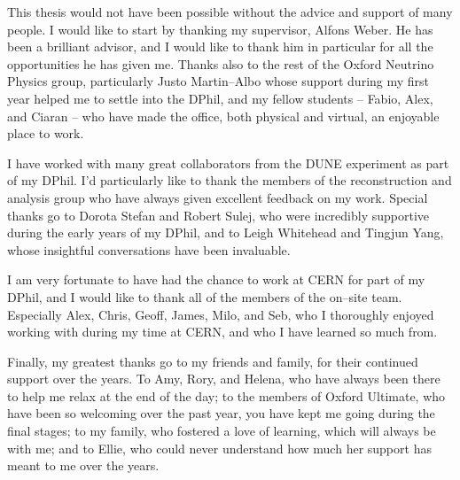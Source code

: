 This thesis would not have been possible without the advice and support of many
people. I would like to start by thanking my supervisor, Alfons Weber. He has
been a brilliant advisor, and I would like to thank him in particular for all
the opportunities he has given me. Thanks also to the rest of the Oxford
Neutrino Physics group, particularly Justo Martin--Albo whose support during 
my first year helped me to settle into the DPhil, and my fellow students -- 
Fabio, Alex, and Ciaran -- who have made the office, both physical and 
virtual, an enjoyable place to work.

\medskip\noindent
I have worked with many great collaborators from the DUNE experiment
as part of my DPhil. I'd particularly like to thank the members of the 
\protodune{} reconstruction and analysis group who have always given 
excellent feedback on my work. Special thanks go to Dorota Stefan and Robert 
Sulej, who were incredibly supportive during the early years of my DPhil, and 
to Leigh Whitehead and Tingjun Yang, whose insightful conversations have been 
invaluable. 

\medskip\noindent
I am very fortunate to have had the chance to work at CERN for part of my DPhil,
and I would like to thank all of the members of the on--site \protodune{} 
team. Especially Alex, Chris, Geoff, James, Milo, and Seb, who I thoroughly 
enjoyed working with during my time at CERN, and who I have learned so much 
from. 

\medskip\noindent
Finally, my greatest thanks go to my friends and family, for their continued
support over the years. To Amy, Rory, and Helena, who have always been there to
help me relax at the end of the day; to the members of Oxford Ultimate, who have
been so welcoming over the past year, you have kept me going during the final 
stages; to my family, who fostered a love of learning, which will always be 
with me; and to Ellie, who could never understand how much her support has 
meant to me over the years.
